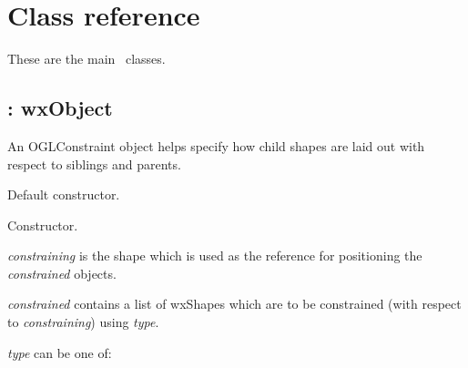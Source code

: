 \chapter{Class reference}\label{classref}
%
\setfooter{\thepage}{}{}{}{}{\thepage}

These are the main \ogl\ classes.

\section{: wxObject}\label{oglconstraint}


An OGLConstraint object helps specify how child shapes are laid out with respect
to siblings and parents.

\label{oglconstraintconstr}


Default constructor.


Constructor.

{\it constraining} is the shape which is used as the reference for positioning the {\it constrained} objects.

{\it constrained} contains a list of wxShapes which are to be constrained (with respect
to {\it constraining}) using {\it type}.

{\it type} can be one of:

